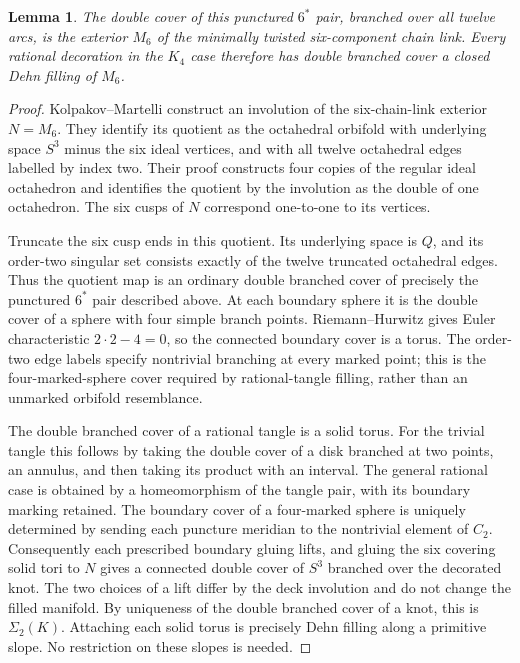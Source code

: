 \documentclass[11pt]{article}
\newtheorem{lemma}[theorem]{Lemma}
\newcommand{\Sig}{\Sigma_2}
\begin{document}
\begin{lemma}\label{lem:m6}
The double cover of this punctured $6^*$ pair, branched over all
twelve arcs, is the exterior $M_6$ of the minimally twisted
six-component chain link. Every rational decoration in the $K_4$ case
therefore has double branched cover a closed Dehn filling of $M_6$.
\end{lemma}
\begin{proof}
Kolpakov--Martelli \cite[Figure~2 and Section~1.1, printed pp.~5--6]{km}
construct an involution of the six-chain-link exterior $N=M_6$.
They identify its quotient as the octahedral orbifold with underlying
space $S^3$ minus the six ideal vertices, and with all twelve
octahedral edges labelled by index two.
Their proof constructs four copies of the regular ideal octahedron
and identifies the quotient by the involution as the double of one
octahedron. The six cusps of $N$ correspond one-to-one to its vertices.

Truncate the six cusp ends in this quotient. Its underlying space is
$Q$, and its order-two singular set consists exactly of the twelve
truncated octahedral edges. Thus the quotient map is an ordinary double
branched cover of precisely the punctured $6^*$ pair described above.
At each boundary sphere it is the double cover of a sphere with four
simple branch points. Riemann--Hurwitz gives Euler characteristic
$2\cdot2-4=0$, so the connected boundary cover is a torus.
The order-two edge labels specify nontrivial branching at every marked
point; this is the four-marked-sphere cover required by rational-tangle
filling, rather than an unmarked orbifold resemblance.

The double branched cover of a rational tangle is a solid torus.
For the trivial tangle this follows by taking the double cover of a
disk branched at two points, an annulus, and then taking its product
with an interval. The general rational case is obtained by a
homeomorphism of the tangle pair, with its boundary marking retained.
The boundary cover of a four-marked sphere is uniquely determined by
sending each puncture meridian to the nontrivial element of $C_2$.
Consequently each prescribed boundary gluing lifts, and gluing the
six covering solid tori to $N$ gives a connected double cover of $S^3$
branched over the decorated knot. The two choices of a lift differ by
the deck involution and do not change the filled manifold.
By uniqueness of the double branched cover of a knot, this is
$\Sig(K)$. Attaching each solid torus is precisely Dehn filling along
a primitive slope. No restriction on these slopes is needed.
\end{proof}
\end{document}

